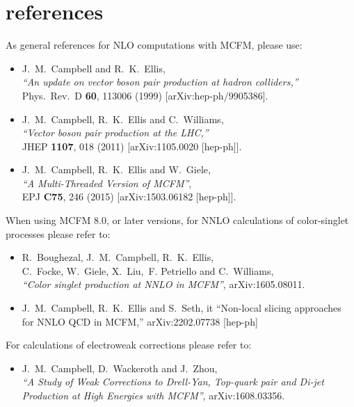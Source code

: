 \section{\MCFM{} references}
\label{MCFMrefs}

As general references for NLO computations with MCFM, please use:
\begin{itemize}
\item J.~M.~Campbell and R.~K.~Ellis, \\
  {\it ``An update on vector boson pair production at hadron colliders,''} \\
  Phys.\ Rev.\ D {\bf 60}, 113006 (1999)
  [arXiv:hep-ph/9905386].
\item J.~M.~Campbell, R.~K.~Ellis and C.~Williams, \\
  {\it ``Vector boson pair production at the LHC,''} \\
  JHEP {\bf 1107}, 018 (2011)
  [arXiv:1105.0020 [hep-ph]]. 
\item J.~M.~Campbell, R.~K.~Ellis and W.~Giele, \\
  {\it ``A Multi-Threaded Version of MCFM''}, \\
    EPJ {\bf C75}, 246 (2015)
    [arXiv:1503.06182 [hep-ph]].

\end{itemize}

When using MCFM 8.0, or later versions, for NNLO calculations of color-singlet
processes please refer to:
\begin{itemize}
\item 
  R.~Boughezal, J.~M.~Campbell, R.~K.~Ellis, \\
   C.~Focke, W.~Giele, X.~Liu,~F. Petriello and  C.~Williams, \\
  {\it ``Color singlet production at NNLO in MCFM''},
  arXiv:1605.08011.
\item
J.~M.~Campbell, R.~K.~Ellis and S.~Seth,
{it ``Non-local slicing approaches for NNLO QCD in MCFM,''}
arXiv:2202.07738 [hep-ph]
\end{itemize}

For calculations of electroweak corrections please refer to:
\begin{itemize}
\item
  J.~M.~Campbell, D.~Wackeroth and J.~Zhou, \\
  {\it ``A Study of Weak Corrections to Drell-Yan, Top-quark pair and Di-jet
  Production at High Energies with MCFM''},
  arXiv:1608.03356.
\end{itemize}

